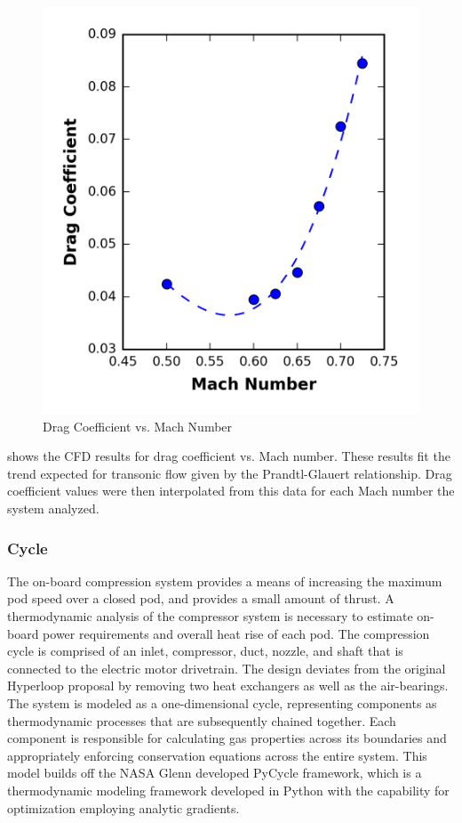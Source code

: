     \begin{figure}
      \centering
      \includegraphics{../../images/graphs/cd_vs_mach/cd_vs_mach.png}
      \caption{Drag Coefficient vs. Mach Number}
      \label{fig:cd_vs_mach}
    \end{figure}
     shows the CFD results for drag coefficient vs. Mach number.
    These results fit the trend expected for transonic flow given by the
    Prandtl-Glauert relationship. Drag coefficient values were then interpolated
    from this data for each Mach number the system analyzed.
  \subsubsection{Cycle}
    The on-board compression system provides a means of increasing the maximum
    pod speed over a closed pod,  and provides a small amount of thrust.
    A thermodynamic analysis of the compressor system is necessary to estimate
    on-board power requirements and overall heat rise of each pod.
    The compression cycle is comprised of an inlet, compressor, duct, nozzle,
    and shaft that is connected to the electric motor drivetrain. The design
    deviates from the original Hyperloop proposal by removing two heat
    exchangers as well as the air-bearings. The system is modeled as a
    one-dimensional cycle, representing components as thermodynamic processes
    that are subsequently chained together. Each component is responsible for
    calculating gas properties across its boundaries and appropriately enforcing
    conservation equations across the entire system. This model builds off the
    NASA Glenn developed PyCycle framework, which is a thermodynamic modeling
    framework developed in Python with the capability for optimization
    employing analytic gradients. \cite{PyCycle}
